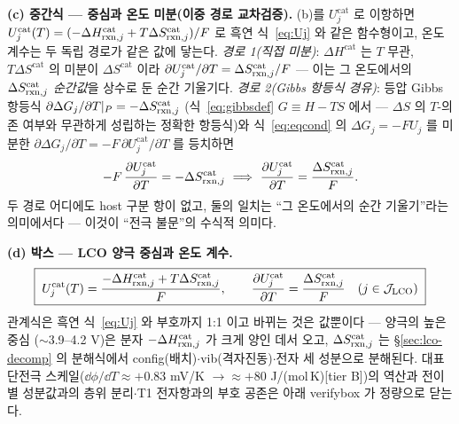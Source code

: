 \textbf{(c) 중간식 --- 중심과 온도 미분(이중 경로 교차검증).}
(b)를 $U_j^\mathrm{cat}$ 로 이항하면 $U_j^\mathrm{cat}(T)=(-\Delta H_{\mathrm{rxn},j}^\mathrm{cat}
+T\Delta S_{\mathrm{rxn},j}^\mathrm{cat})/F$ 로 흑연 식~\eqref{eq:Uj} 와 같은 함수형이고, 온도 계수는 두 독립
경로가 같은 값에 닿는다. \emph{경로 1(직접 미분)}: $\Delta H^\mathrm{cat}$ 는 $T$ 무관, $T\Delta S^\mathrm{cat}$
의 미분이 $\Delta S^\mathrm{cat}$ 이라 $\partial U_j^\mathrm{cat}/\partial T=\Delta S_{\mathrm{rxn},j}^\mathrm{cat}/F$
--- 이는 그 온도에서의 $\Delta S_{\mathrm{rxn},j}^\mathrm{cat}$ \emph{순간값}을 상수로 둔 순간 기울기다.
\emph{경로 2(Gibbs 항등식 경유)}: 등압 Gibbs 항등식 $\partial\Delta G_j/\partial T|_P=-\Delta S_{\mathrm{rxn},j}^\mathrm{cat}$
(식~\eqref{eq:gibbsdef} $G\equiv H-TS$ 에서 --- $\Delta S$ 의 $T$-의존 여부와 무관하게 성립하는 정확한
항등식)와 식~\eqref{eq:eqcond} 의 $\Delta G_j=-FU_j$ 를 미분한
$\partial\Delta G_j/\partial T=-F\,\partial U_j^\mathrm{cat}/\partial T$ 를 등치하면
\[
-F\,\frac{\partial U_j^\mathrm{cat}}{\partial T}=-\Delta S_{\mathrm{rxn},j}^\mathrm{cat}
\ \Longrightarrow\
\frac{\partial U_j^\mathrm{cat}}{\partial T}=\frac{\Delta S_{\mathrm{rxn},j}^\mathrm{cat}}{F}.
\]
두 경로 어디에도 host 구분 항이 없고, 둘의 일치는 ``그 온도에서의 순간 기울기''라는 의미에서다 ---
이것이 ``전극 불문''의 수식적 의미다.

\textbf{(d) 박스 --- LCO 양극 중심과 온도 계수.}
\begin{equation}
\boxed{\;
U_j^\mathrm{cat}(T)=\frac{-\Delta H_{\mathrm{rxn},j}^\mathrm{cat}+T\Delta S_{\mathrm{rxn},j}^\mathrm{cat}}{F},
\qquad
\frac{\partial U_j^\mathrm{cat}}{\partial T}=\frac{\Delta S_{\mathrm{rxn},j}^\mathrm{cat}}{F}
\quad(j\in\mathcal J_\mathrm{LCO})\;}
\label{eq:lco-dUdT}
\end{equation}
관계식은 흑연 식~\eqref{eq:Uj} 와 부호까지 1:1 이고 바뀌는 것은 값뿐이다 --- 양극의 높은 중심
($\sim$3.9--4.2 V)은 분자 $-\Delta H_{\mathrm{rxn},j}^\mathrm{cat}$ 가 크게 양인 데서 오고, $\Delta S_{\mathrm{rxn},j}^\mathrm{cat}$
는 \S\ref{sec:lco-decomp} 의 분해식에서 config(배치)$\cdot$vib(격자진동)$\cdot$전자 세 성분으로 분해된다.
대표 단전극 스케일($\dd\phi/\dd T\approx+0.83$ mV/K $\to\approx+80$ J/(mol\,K)[tier B])의 역산과
전이별 성분값과의 층위 분리$\cdot$T1 전자항과의 부호 공존은 아래 verifybox 가 정량으로 닫는다.


